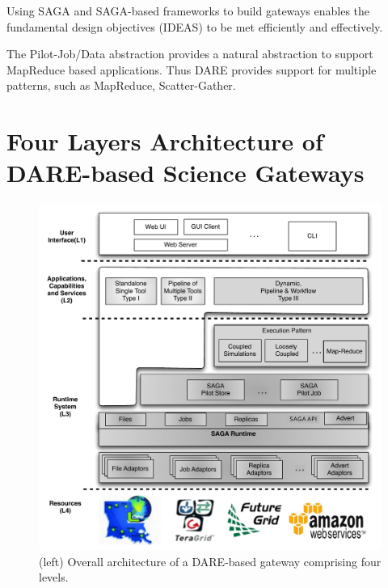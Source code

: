 \documentclass[]{svjour3}
\begin{document}
Using SAGA and SAGA-based frameworks to build gateways enables the
fundamental design objectives (IDEAS) to be met efficiently and
effectively.

The Pilot-Job/Data abstraction provides a natural abstraction to
support MapReduce based applications. Thus DARE provides support for
multiple patterns, such as MapReduce, Scatter-Gather.


\section{Four Layers Architecture of DARE-based Science
  Gateways}


\begin{figure}
  \centering
  \includegraphics[scale=0.55]{figures/DARE-gateway-arch.pdf}
  \caption{\small {}(left) Overall architecture of a DARE-based gateway comprising four levels. %
  }
  \label{fig:dare-arch} 
\end{figure}
\end{document}
